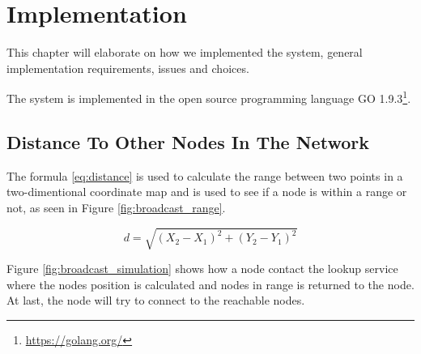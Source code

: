 \documentclass[USenglish]{uit-thesis}
\begin{document}





\chapter{Implementation}

This chapter will elaborate on how we implemented the system, general implementation requirements, issues and choices. 

The system is implemented in the open source programming language GO 1.9.3\footnote{\url{https://golang.org/}}.


\section{Distance To Other Nodes In The Network}

The formula \ref{eq:distance} is used to calculate the range between two points in a two-dimentional coordinate map and is used to see if a node is within a range or not, as seen in Figure \ref{fig:broadcast_range}.

\begin{equation} \label{eq:distance}
d = \sqrt{(X_{2} - X_{1})^{2}+(Y_{2} - Y_{1})^{2}}
\end{equation}


Figure \ref{fig:broadcast_simulation} shows how a node contact the lookup service where the nodes position is calculated and nodes in range is returned to the node. At last, the node will try to connect to the reachable nodes.
\end{document}
